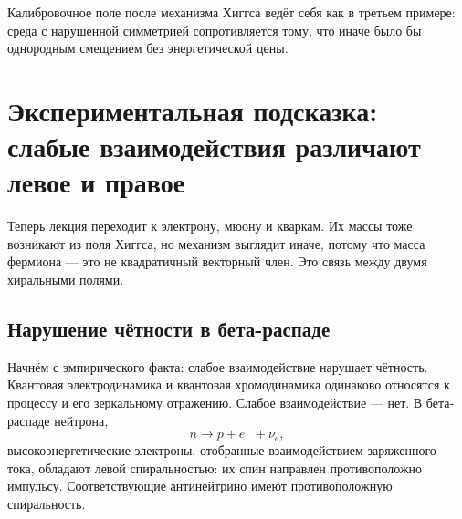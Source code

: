 Калибровочное поле после механизма Хиггса ведёт себя как в третьем примере: среда с нарушенной симметрией сопротивляется тому, что иначе было бы однородным смещением без энергетической цены.

\begin{classroomqa}
\end{classroomqa}

\begin{classroomqa}
\end{classroomqa}

\section{Экспериментальная подсказка: слабые взаимодействия различают левое и правое}

Теперь лекция переходит к электрону, мюону и кваркам. Их массы тоже возникают из поля Хиггса, но механизм выглядит иначе, потому что масса фермиона — это не квадратичный векторный член. Это связь между двумя хиральными полями.

\subsection{Нарушение чётности в бета-распаде}

Начнём с эмпирического факта: слабое взаимодействие нарушает чётность. Квантовая электродинамика и квантовая хромодинамика одинаково относятся к процессу и его зеркальному отражению. Слабое взаимодействие — нет. В бета-распаде нейтрона,
\begin{equation}
  n\longrightarrow p+e^-+\bar\nu_e,
  \label{eq:l09-beta-decay}
\end{equation}
высокоэнергетические электроны, отобранные взаимодействием заряженного тока, обладают левой спиральностью: их спин направлен противоположно импульсу. Соответствующие антинейтрино имеют противоположную спиральность.

